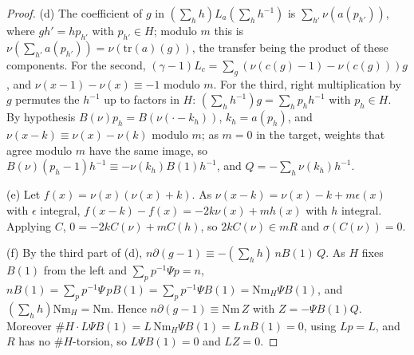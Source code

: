 \begin{proof}
(d) The coefficient of $g$ in $(\sum_hh)L_a(\sum_hh^{-1})$ is $\sum_{h'}\nu(a(p_{h'}))$, where $gh'=hp_{h'}$ with $p_{h'}\in H$; modulo $m$ this is $\nu(\sum_{h'}a(p_{h'}))=\nu(\mathrm{tr}(a)(g))$, the transfer being the product of these components. For the
second, $(\gamma-1)L_c=\sum_g(\nu(c(g)-1)-\nu(c(g)))g$, and $\nu(x-1)-\nu(x)\equiv-1$ modulo $m$. For the third, right multiplication by $g$ permutes the $h^{-1}$ up to factors in $H$: $(\sum_hh^{-1})g=\sum_hp_hh^{-1}$ with $p_h\in H$. By hypothesis $B(\nu)p_h=B(\nu(\cdot-k_h))$, $k_h=a(p_h)$, and $\nu(x-k)\equiv\nu(x)-\nu(k)$ modulo $m$;
as $m=0$ in the target, weights that agree modulo $m$ have the same image, so $B(\nu)(p_h-1)h^{-1}\equiv-\nu(k_h)B(1)h^{-1}$, and $Q=-\sum_h\nu(k_h)h^{-1}$.

(e) Let $f(x)=\nu(x)(\nu(x)+k)$. As $\nu(x-k)=\nu(x)-k+m\epsilon(x)$ with $\epsilon$ integral, $f(x-k)-f(x)=-2k\nu(x)+mh(x)$ with $h$ integral. Applying $C$, $0=-2kC(\nu)+mC(h)$, so $2kC(\nu)\in mR$ and $\sigma(C(\nu))=0$.

(f) By the third part of (d), $n\partial(g-1)\equiv-(\sum_hh)\,nB(1)\,Q$. As $H$ fixes $B(1)$ from the left and $\sum_pp^{-1}\Psi p=n$, $nB(1)=\sum_pp^{-1}\Psi\,pB(1)=\sum_pp^{-1}\Psi B(1)=\mathrm{Nm}_H\Psi B(1)$, and $(\sum_hh)\mathrm{Nm}_H=\mathrm{Nm}$. Hence
$n\partial(g-1)\equiv\mathrm{Nm}\,Z$ with $Z=-\Psi B(1)Q$. Moreover $\#H\cdot L\Psi B(1)=L\,\mathrm{Nm}_H\Psi B(1)=L\,nB(1)=0$, using $Lp=L$, and $R$ has no $\#H$-torsion, so $L\Psi B(1)=0$ and $LZ=0$.
\end{proof}

